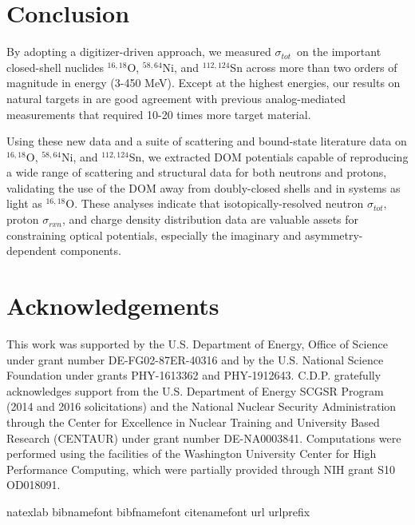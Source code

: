 \documentclass[twocolumn,secnumarabic,amssymb, nobibnotes, aps, prl,
superscriptaddress, nobalancelastpage]{revtex4}
\newcommand{\tot}{\ensuremath{\sigma_{tot}}}
\newcommand{\rxn}{\ensuremath{\sigma_{rxn}}}
\newcommand{\oSixEight}{\ensuremath{^{16,18}}O}
\newcommand{\niEightFour}{\ensuremath{^{58,64}}N\lowercase{i}}
\newcommand{\snTwelveFour}{\ensuremath{^{112,124}}S\lowercase{n}}
\begin{document}
\section{Conclusion}
By adopting a digitizer-driven
approach, we measured \tot\ on the important closed-shell nuclides
$^{16,18}$O, $^{58,64}$Ni, and $^{112,124}$Sn across more than two orders of
magnitude in energy (3-450 MeV). Except at the highest energies, our results
on natural targets in are good agreement with previous analog-mediated measurements
that required 10-20 times more target material. 

Using these new data and a suite of scattering and bound-state literature data
on \oSixEight, \niEightFour, and \snTwelveFour,
we extracted DOM potentials capable of reproducing a wide range of scattering
and structural data for both neutrons and protons, validating the use of the
DOM away from doubly-closed shells and in systems as light as \oSixEight.
These analyses indicate that isotopically-resolved neutron \tot,
proton \rxn, and charge density distribution data are valuable assets for
constraining optical potentials, especially the imaginary and
asymmetry-dependent components.

\section{Acknowledgements}
This work was supported by the U.S. Department of Energy, Office of Science under grant number
DE-FG02-87ER-40316 and by the U.S. National Science Foundation under grants
PHY-1613362 and PHY-1912643. C.D.P. gratefully acknowledges support from the
U.S. Department of Energy SCGSR Program (2014 and 2016 solicitations) and the
National Nuclear Security Administration through the Center for Excellence in Nuclear
Training and University Based Research (CENTAUR) under grant number DE-NA0003841.
Computations were performed using the facilities of the Washington University
Center for High Performance Computing, which were partially provided through NIH
grant S10 OD018091. 


\begin{thebibliography}{32} \expandafter\ifx\csname
        natexlab\endcsname\relax\def\natexlab#1{#1}\fi \expandafter\ifx\csname
        bibnamefont\endcsname\relax \def\bibnamefont#1{#1}\fi
        \expandafter\ifx\csname bibfnamefont\endcsname\relax
        \def\bibfnamefont#1{#1}\fi \expandafter\ifx\csname
        citenamefont\endcsname\relax \def\citenamefont#1{#1}\fi
        \expandafter\ifx\csname url\endcsname\relax \def\url#1{\texttt{#1}}\fi
        \expandafter\ifx\csname urlprefix\endcsname\relax\def\urlprefix{URL
        }\fi \providecommand{\bibinfo}[2]{#2}
        \providecommand{\eprint}[2][]{\url{#2}}
\end{thebibliography}
\end{document}
